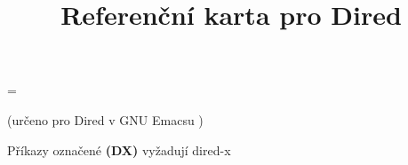 \def\key#1#2{\leavevmode\hbox to \hsize{\vtop
  {\hsize=.75\hsize\rightskip=1em
  \hskip\keyindent\relax#1}\kbd{#2}\hfil}}

\newbox\metaxbox
\setbox\metaxbox\hbox{}
\newdimen\metaxwidth
\metaxwidth=\wd\metaxbox

\def\metax#1#2{\leavevmode\hbox to \hsize{\hbox to .75\hsize
  {\hskip\keyindent\relax#1\hfil}%
  \hskip -\metaxwidth minus 1fil
  \kbd{#2}\hfil}}

\def\threecol#1#2#3{\hskip\keyindent\relax#1\hfil&\kbd{#2}\hfil\quad
  &\kbd{#3}\hfil\quad\cr}

\def\dx{{\bf (DX)}}



\title{Referenční karta pro Dired}

\centerline{(určeno pro Dired v GNU Emacsu \versionemacs)}
\centerline{Příkazy označené \dx{} vyžadují dired-x}




